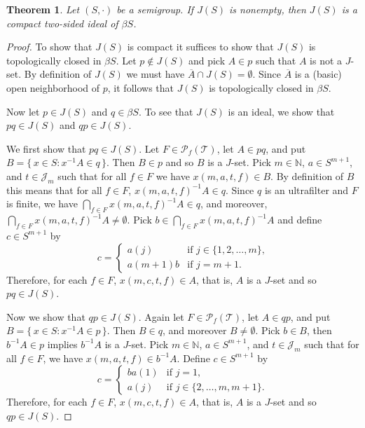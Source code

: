 \documentclass[12pt]{article}
\theoremstyle{plain}
\newtheorem{thm}{Theorem}[section]
\theoremstyle{definition}
\newcommand{\bbN}{\mathbb{N}}
\newcommand{\calJ}{\mathcal{J}}
\newcommand{\calT}{\mathcal{T}}
\newcommand{\Pf}{\mathcal{P}_f}
\begin{document}
\begin{thm}
  Let $(S, \cdot)$ be a semigroup.
  If $J(S)$ is nonempty, then $J(S)$ is a compact two-sided ideal of $\beta S$.
\end{thm}
\begin{proof}
  To show that $J(S)$ is compact it suffices to show that $J(S)$ is topologically closed in $\beta S$.
  Let $p \not\in J(S)$ and pick $A \in p$ such that $A$ is not a $J$-set.
  By definition of $J(S)$ we must have $\overline{A} \cap J(S) = \emptyset$.
  Since $\overline{A}$ is a (basic) open neighborhood of $p$, it follows that $J(S)$ is topologically closed in $\beta S$.

  Now let $p \in J(S)$ and $q \in \beta S$.
  To see that $J(S)$ is an ideal, we show that $pq \in J(S)$ and $qp \in J(S)$. 

  We first show that $pq \in J(S)$.
  Let $F \in \Pf(\calT)$, let $A \in pq$, and put $B = \{\, x \in S : x^{-1}A \in q \,\}$.
  Then $B \in p$ and so $B$ is a $J$-set.
  Pick $m \in \bbN$, $a \in S^{m+1}$, and $t \in \calJ_m$ such that for all $f \in F$ we have $x(m, a, t, f) \in B$.
  By definition of $B$ this means that for all $f \in F$, $x(m, a, t, f)^{-1}A \in q$. 
  Since $q$ is an ultrafilter and $F$ is finite, we have $\bigcap_{f \in F} x(m, a, t, f)^{-1}A \in q$, and moreover, $\bigcap_{f \in F} x(m, a, t, f)^{-1}A \ne \emptyset$.
  Pick $b \in \bigcap_{f \in F} x(m, a, t, f)^{-1}A$ and define $c \in S^{m+1}$ by
  \[
    c =
    \begin{cases}
      a(j) & \mbox{if $j \in \{1, 2, \ldots, m\}$,} \\
      a(m+1)b & \mbox{if $j = m+1$.}
    \end{cases}
  \]
  Therefore, for each $f \in F$, $x(m, c, t, f) \in A$, that is, $A$ is a $J$-set and so $pq \in J(S)$.

  Now we show that $qp \in J(S)$.
  Again let $F \in \Pf(\calT)$, let $A \in qp$, and put $B = \{\, x \in S : x^{-1}A \in p \,\}$.
  Then $B \in q$, and moreover $B \ne \emptyset$.
  Pick $b \in B$, then $b^{-1}A \in p$ implies $b^{-1}A$ is a $J$-set.
  Pick $m \in \bbN$, $a \in S^{m+1}$, and $t \in \calJ_m$ such that for all $f \in F$, we have $x(m, a, t, f) \in b^{-1}A$.
  Define $c \in S^{m+1}$ by
  \[
    c =
    \begin{cases}
      ba(1) & \mbox{if $j =1$,} \\
      a(j) & \mbox{if $j \in \{2, \ldots, m, m+1\}$.}
    \end{cases}
  \]
  Therefore, for each $f \in F$, $x(m, c, t, f) \in A$, that is, $A$ is a $J$-set and so $qp \in J(S)$.
\end{proof}
\end{document}
